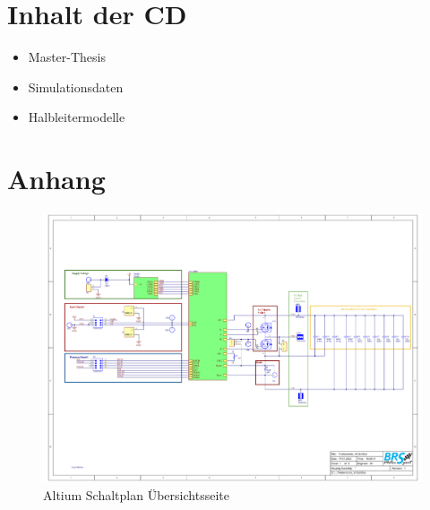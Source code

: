\chapter{Inhalt der CD}
\begin{itemize}
	\item Master-Thesis
	\item Simulationsdaten
	\item Halbleitermodelle

\end{itemize}

\chapter{Anhang}
\setcounter{figure}{0}
\renewcommand{\thefigure}{A\arabic{figure}}

\setcounter{table}{0}
\renewcommand{\thetable}{A\arabic{table}}

\begin{figure}
	\centering
	\includegraphics[angle=90, width=1\linewidth]{content/Grafiken/Schematic1}
	\caption{Altium Schaltplan Übersichtsseite}
	\label{fig:schematic1}
\end{figure}



